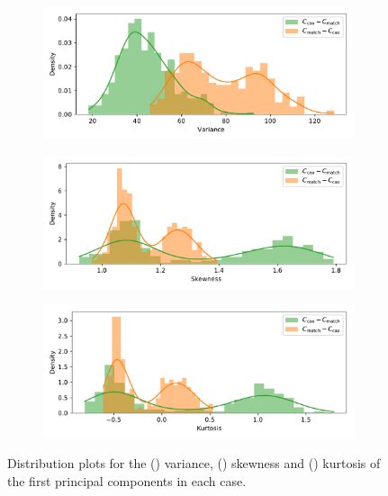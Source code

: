 \documentclass[11pt]{article}
\newcommand{\imgwidth}{.85\textwidth}
\begin{document}
\begin{figure}
    \centering
    \begin{subfigure}{\imgwidth}
        \includegraphics[width=\linewidth]{Fig10a.pdf}%
        \caption{}\label{fig:edo_variance}
    \end{subfigure}

    \begin{subfigure}{\imgwidth}
        \includegraphics[width=\linewidth]{Fig10b.pdf}%
    \caption{}\label{fig:edo_skewness}
    \end{subfigure}
    
    \begin{subfigure}{\imgwidth}
        \includegraphics[width=\linewidth]{Fig10c.pdf}%
        \caption{}\label{fig:edo_kurtosis}
    \end{subfigure}
    \caption{Distribution plots for the () variance,
        () skewness and ()
        kurtosis of the first principal components in each
        case.}\label{fig:edo_moments}
\end{figure}
\end{document}
